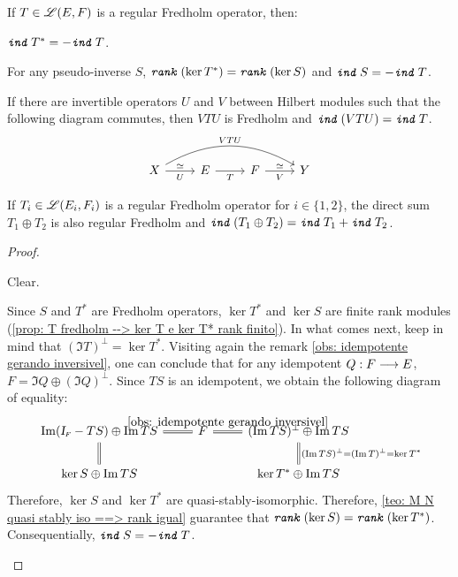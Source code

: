 \begin{proposicao}
\label{prop: propriedades de fredholm}
If $T\in \mathscr L(E,F)$ is a regular Fredholm operator, then:
\begin{itroman}
\item $\texttt{\textit{ind}}\, T^* = -\texttt{\textit{ind}}\, T$.
\item \label{prop item: propriedades de fredholm} For any pseudo-inverse $S$, $\texttt{\textit{rank}}\,(\ker T^*) = \texttt{\textit{rank}}\,(\ker S)$ and $\texttt{\textit{ind}}\, S = - \texttt{\textit{ind}}\, T$.
\item \label{prop item: invertivel tem ind = 0} If there are invertible operators $U$ and $V$ between Hilbert modules such that the following diagram commutes, then $VTU$ is Fredholm and $\texttt{\textit{ind}}\,(VTU) = \texttt{\textit{ind}}\, T$.
\begin{equation*}
\begin{tikzcd}
X \arrow[r, "U"', "\simeq"] \arrow[rrr, "VTU", bend left] & E \arrow[r, "T"'] & F \arrow[r, "V"', "\simeq"] & Y
\end{tikzcd}
\end{equation*}
\item \label{prop item: ind(T (+) F) = ind T + ind F} If $T_i\in \mathscr L(E_i,F_i)$ is a regular Fredholm operator for $i\in \{1,2\}$, the direct sum $T_1\oplus T_2$ is also regular Fredholm and $\texttt{\textit{ind}}\,(T_1\oplus T_2) = \texttt{\textit{ind}}\, T_1  + \texttt{\textit{ind}}\, T_2$.
\end{itroman}
\begin{proof}$\left.\right.$
\begin{itroman}
\item Clear.
\item Since $S$ and $T^*$ are Fredholm operators, $\ker T^*$ and $\ker S$ are finite rank modules (\ref{prop: T fredholm --> ker T e ker T* rank finito}). In what comes next, keep in mind that $(\Im T)^{\perp} = \ker T^*$. Visiting again the remark \ref{obs: idempotente gerando inversivel}, one can conclude that for any idempotent $Q : F \longrightarrow E$, $F = \Im Q \oplus (\Im Q)^{\perp}$. Since $TS$ is an idempotent, we obtain the following diagram of equality:
\begin{equation*}
\begin{tikzcd}
\Im(\sub\Id F-TS)\oplus \Im TS \arrow[d, equal] & F \arrow[l, equal] \arrow[r, equal, "\ref{obs: idempotente gerando inversivel}"] & (\Im TS)^{\perp} \oplus\Im TS \arrow[d, "(\Im TS)^{\perp} = (\Im T)^{\perp} = \ker T^*", equal] \\
\ker S \oplus \Im TS    &  & \ker T^* \oplus \Im TS                                                            
\end{tikzcd}
\end{equation*}
Therefore, $\ker S$ and $\ker T^*$ are quasi-stably-isomorphic. Therefore, \ref{teo: M N quasi stably iso ==> rank igual} guarantee that $\texttt{\textit{rank}}\,(\ker S) = \texttt{\textit{rank}}\,(\ker T^*)$. Consequentially, $\texttt{\textit{ind}}\, S = -\texttt{\textit{ind}}\, T$.


\end{itroman}
\end{proof}
\end{proposicao}
